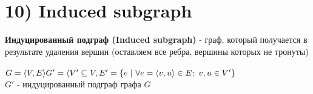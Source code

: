 \documentclass[../TM3-UltraDoc.tex]{subfiles}
\begin{document}
	\section*{10) Induced subgraph}
	\textbf{Индуцированный подграф (Induced subgraph)} - граф, который получается в результате удаления вершин (оставляем все ребра, вершины которых не тронуты)\\
	\\
	\(
	G = \langle V, E\rangle\\
	G' = \langle V' \subseteq V, E' = \{e \ | \ \forall e = \langle v, u \rangle \in E; \ v, u \in V' \}\\
	\)\\
	$G'$ - индуцированный подграф графа $G$\\
\end{document}
